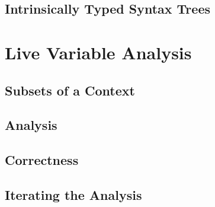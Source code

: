 \documentclass[11pt,a4paper]{article}
\begin{document}
\subsection{Intrinsically Typed Syntax Trees}

\CodeLangTypes


\CodeLangCtx


\CodeLangRef

\CodeLangExpr


\CodeLangSemantics


\section{Live Variable Analysis}
\cite{nielsen1999analysis}

\subsection{Subsets of a Context}
\cite{chapman2009type}

\CodeSubsetSubset
\CodeSubsetOpSubseteq

\subsection{Analysis}

\CodeLiveExpr

\subsection{Correctness}

\subsection{Iterating the Analysis}
\cite{bove2016recursion}
\end{document}

